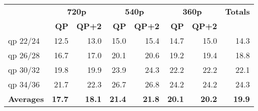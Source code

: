 \begin{table}[htbp]
{\begin{tabular}{l|rr|rr|rr|r}
       & \multicolumn{2}{c|}{\textbf{720p}} & \multicolumn{2}{c|}{\textbf{540p}} & \multicolumn{2}{c|}{\textbf{360p}} & \multicolumn{1}{c}{\textbf{Totals}} \\
       & \textbf{QP} & \textbf{QP+2} & \textbf{QP} & \textbf{QP+2} & \textbf{QP} & \textbf{QP+2} &  \\
    qp 22/24 & 12.5 & 13.0 & 15.0 & 15.4 & 14.7 & 15.0 & 14.3 \\
    qp 26/28 & 16.7 & 17.0 & 20.1 & 20.6 & 19.2 & 19.4 & 18.8 \\
    qp 30/32 & 19.8 & 19.9 & 23.9 & 24.3 & 22.2 & 22.2 & 22.1 \\
    qp 34/36 & 21.7 & 22.3 & 26.7 & 26.8 & 24.2 & 24.2 & 24.3 \\
    \textbf{Averages} & \textbf{17.7} & \textbf{18.1} & \textbf{21.4} & \textbf{21.8} & \textbf{20.1} & \textbf{20.2} & \textbf{19.9} \\
    \bottomrule
    \end{tabular}%
  }
  \label{tab:sbh0_pruning_rdoq0_fp}%
\end{table}%
